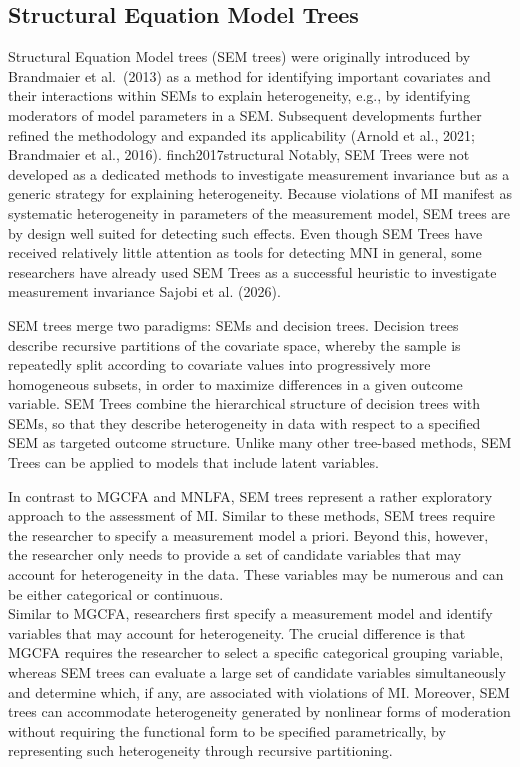 \documentclass[
  man,
  floatsintext]{apa7}
\begin{document}
\subsection{Structural Equation Model
Trees}\label{structural-equation-model-trees}

Structural Equation Model trees (SEM trees) were originally introduced
by Brandmaier et al.~(2013) as a method for identifying important
covariates and their interactions within SEMs to explain heterogeneity,
e.g., by identifying moderators of model parameters in a SEM. Subsequent
developments further refined the methodology and expanded its
applicability (Arnold et al., 2021; Brandmaier et al., 2016).
finch2017structural Notably, SEM Trees were not developed as a dedicated
methods to investigate measurement invariance but as a generic strategy
for explaining heterogeneity. Because violations of MI manifest as
systematic heterogeneity in parameters of the measurement model, SEM
trees are by design well suited for detecting such effects. Even though
SEM Trees have received relatively little attention as tools for
detecting MNI in general, some researchers have already used SEM Trees
as a successful heuristic to investigate measurement invariance {Sajobi
et al.} (2026).

SEM trees merge two paradigms: SEMs and decision trees. Decision trees
describe recursive partitions of the covariate space, whereby the sample
is repeatedly split according to covariate values into progressively
more homogeneous subsets, in order to maximize differences in a given
outcome variable. SEM Trees combine the hierarchical structure of
decision trees with SEMs, so that they describe heterogeneity in data
with respect to a specified SEM as targeted outcome structure. Unlike
many other tree-based methods, SEM Trees can be applied to models that
include latent variables.

In contrast to MGCFA and MNLFA, SEM trees represent a rather exploratory
approach to the assessment of MI. Similar to these methods, SEM trees
require the researcher to specify a measurement model a priori. Beyond
this, however, the researcher only needs to provide a set of candidate
variables that may account for heterogeneity in the data. These
variables may be numerous and can be either categorical or continuous.\\
Similar to MGCFA, researchers first specify a measurement model and
identify variables that may account for heterogeneity. The crucial
difference is that MGCFA requires the researcher to select a specific
categorical grouping variable, whereas SEM trees can evaluate a large
set of candidate variables simultaneously and determine which, if any,
are associated with violations of MI. Moreover, SEM trees can
accommodate heterogeneity generated by nonlinear forms of moderation
without requiring the functional form to be specified parametrically, by
representing such heterogeneity through recursive partitioning.
\end{document}
